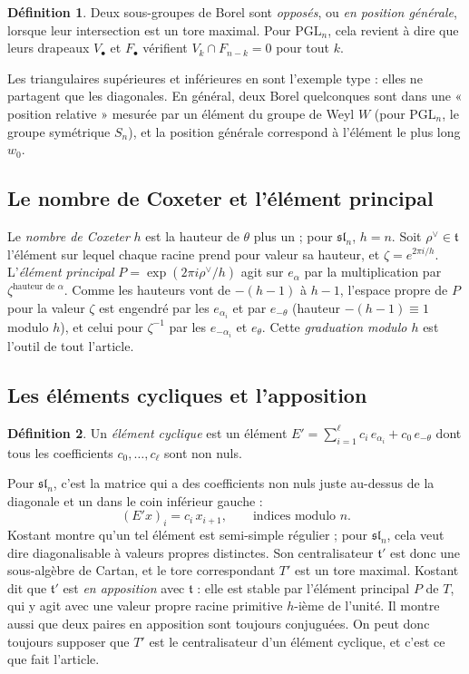 \documentclass[11pt,a4paper]{amsart}
\theoremstyle{definition}
\newtheorem{definition}{Définition}
\theoremstyle{plain}
\theoremstyle{remark}
\newcommand{\tl}{\mathfrak t}
\newcommand{\PGL}{\mathrm{PGL}}
\begin{document}
\begin{definition}
Deux sous-groupes de Borel sont \emph{opposés}, ou \emph{en position générale}, lorsque leur intersection est un tore maximal. Pour $\PGL_n$, cela revient à dire que leurs drapeaux $V_\bullet$ et $F_\bullet$ vérifient $V_k \cap F_{n-k} = 0$ pour tout $k$.
\end{definition}

Les triangulaires supérieures et inférieures en sont l'exemple type : elles ne partagent que les diagonales. En général, deux Borel quelconques sont dans une « position relative » mesurée par un élément du groupe de Weyl $W$ (pour $\PGL_n$, le groupe symétrique $S_n$), et la position générale correspond à l'élément le plus long $w_0$.

\subsection{Le nombre de Coxeter et l'élément principal}

Le \emph{nombre de Coxeter} $h$ est la hauteur de $\theta$ plus un ; pour $\mathfrak{sl}_n$, $h = n$. Soit $\rho^\vee \in \tl$ l'élément sur lequel chaque racine prend pour valeur sa hauteur, et $\zeta = e^{2\pi i/h}$. L'\emph{élément principal} $P = \exp(2\pi i \rho^\vee/h)$ agit sur $e_\alpha$ par la multiplication par $\zeta^{\text{hauteur de }\alpha}$. Comme les hauteurs vont de $-(h-1)$ à $h-1$, l'espace propre de $P$ pour la valeur $\zeta$ est engendré par les $e_{\alpha_i}$ et par $e_{-\theta}$ (hauteur $-(h-1) \equiv 1$ modulo $h$), et celui pour $\zeta^{-1}$ par les $e_{-\alpha_i}$ et $e_\theta$. Cette \emph{graduation modulo $h$} est l'outil de tout l'article.

\subsection{Les éléments cycliques et l'apposition}

\begin{definition}
Un \emph{élément cyclique} est un élément $E' = \sum_{i=1}^{\ell} c_i\, e_{\alpha_i} + c_0\, e_{-\theta}$ dont tous les coefficients $c_0, \dots, c_\ell$ sont non nuls.
\end{definition}

Pour $\mathfrak{sl}_n$, c'est la matrice qui a des coefficients non nuls juste au-dessus de la diagonale et un dans le coin inférieur gauche :
\[
(E'x)_i = c_i\, x_{i+1}, \qquad \text{indices modulo } n.
\]
Kostant montre qu'un tel élément est semi-simple régulier ; pour $\mathfrak{sl}_n$, cela veut dire diagonalisable à valeurs propres distinctes. Son centralisateur $\tl'$ est donc une sous-algèbre de Cartan, et le tore correspondant $T'$ est un tore maximal. Kostant dit que $\tl'$ est \emph{en apposition} avec $\tl$ : elle est stable par l'élément principal $P$ de $T$, qui y agit avec une valeur propre racine primitive $h$-ième de l'unité. Il montre aussi que deux paires en apposition sont toujours conjuguées. On peut donc toujours supposer que $T'$ est le centralisateur d'un élément cyclique, et c'est ce que fait l'article.
\end{document}
